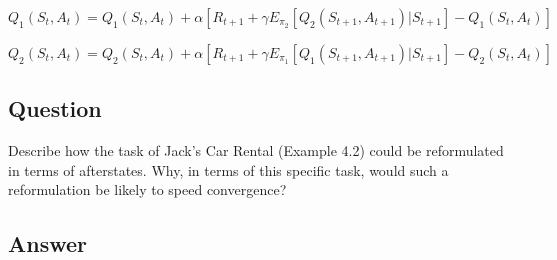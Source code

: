 \documentclass[11pt]{article}
\begin{document}
    $ Q_1(S_t, A_t) =  Q_1(S_t, A_t) + \alpha [ R_{t+1} + \gamma E_{\pi_2} [ Q_2(S_{t+1}, A_{t+1}) | S_{t+1}] - Q_1(S_t, A_t) ] $
    \newline

    $ Q_2(S_t, A_t) =  Q_2(S_t, A_t) + \alpha [ R_{t+1} + \gamma E_{\pi_1} [ Q_1(S_{t+1}, A_{t+1}) | S_{t+1}] - Q_2(S_t, A_t) ] $


    \subsection{Question}

    Describe how the task of Jack’s Car Rental (Example 4.2) could be reformulated in terms of afterstates.
    Why, in terms of this specific task, would such a  reformulation be likely to speed convergence?

    \subsection*{Answer}
\end{document}

